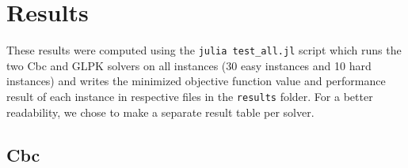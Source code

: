 \newpage
\chapter{Results}

These results were computed using the \verb+julia test_all.jl+ script which runs the two Cbc and GLPK solvers on all instances (30 easy instances and 10 hard instances) and writes the minimized objective function value and performance result of each instance in respective files in the \verb+results+ folder. For a better readability, we chose to make a separate result table per solver.

\section{Cbc}


